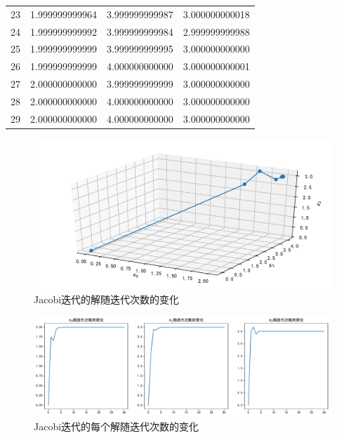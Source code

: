 \begin{table}[H]
\begin{tabular}{llll}
		23   & 1.999999999964 & 3.999999999987 & 3.000000000018 \\
		24   & 1.999999999992 & 3.999999999984 & 2.999999999988 \\
		25   & 1.999999999999 & 3.999999999995 & 3.000000000000 \\
		26   & 1.999999999999 & 4.000000000000 & 3.000000000001 \\
		27   & 2.000000000000 & 3.999999999999 & 3.000000000000 \\
		28   & 2.000000000000 & 4.000000000000 & 3.000000000000 \\
		29   & 2.000000000000 & 4.000000000000 & 3.000000000000 \\ \hline
	\end{tabular}
\end{table}

\begin{figure}[H]
	\centering
	\caption{Jacobi迭代的解随迭代次数的变化}
	\includegraphics[width=\linewidth]{fig13.pdf}
\end{figure}

\begin{figure}[H]
	\centering
	\caption{Jacobi迭代的每个解随迭代次数的变化}
	\includegraphics[width=\linewidth]{fig14.pdf}
\end{figure}


